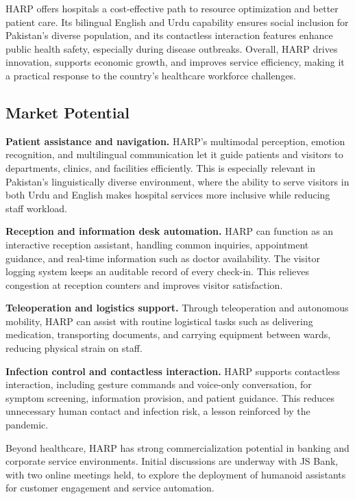 \documentclass[11pt,a4paper]{article}
\begin{document}
HARP offers hospitals a cost-effective path to resource optimization and better patient care. Its bilingual English and Urdu capability ensures social inclusion for Pakistan's diverse population, and its contactless interaction features enhance public health safety, especially during disease outbreaks. Overall, HARP drives innovation, supports economic growth, and improves service efficiency, making it a practical response to the country's healthcare workforce challenges.

\subsection{Market Potential}

\textbf{Patient assistance and navigation.} HARP's multimodal perception, emotion recognition, and multilingual communication let it guide patients and visitors to departments, clinics, and facilities efficiently. This is especially relevant in Pakistan's linguistically diverse environment, where the ability to serve visitors in both Urdu and English makes hospital services more inclusive while reducing staff workload.

\textbf{Reception and information desk automation.} HARP can function as an interactive reception assistant, handling common inquiries, appointment guidance, and real-time information such as doctor availability. The visitor logging system keeps an auditable record of every check-in. This relieves congestion at reception counters and improves visitor satisfaction.

\textbf{Teleoperation and logistics support.} Through teleoperation and autonomous mobility, HARP can assist with routine logistical tasks such as delivering medication, transporting documents, and carrying equipment between wards, reducing physical strain on staff.

\textbf{Infection control and contactless interaction.} HARP supports contactless interaction, including gesture commands and voice-only conversation, for symptom screening, information provision, and patient guidance. This reduces unnecessary human contact and infection risk, a lesson reinforced by the pandemic.

Beyond healthcare, HARP has strong commercialization potential in banking and corporate service environments. Initial discussions are underway with JS Bank, with two online meetings held, to explore the deployment of humanoid assistants for customer engagement and service automation.
\end{document}
